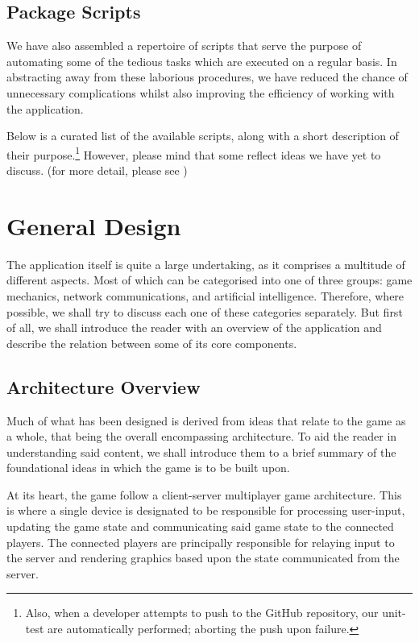 \documentclass{standalone}
\begin{document}
		\subsection{Package Scripts}
			We have also assembled a repertoire of scripts that serve the purpose of automating some of the tedious tasks which are executed on a regular basis. In abstracting away from these laborious procedures, we have reduced the chance of unnecessary complications whilst also improving the efficiency of working with the application.

			Below is a curated list of the available scripts, along with a short description of their purpose.\footnote{Also, when a developer attempts to push to the GitHub repository, our unit-test are automatically performed; aborting the push upon failure.} However, please mind that some reflect ideas we have yet to discuss. (for more detail, please see )
			\begin{formal}
				
			\end{formal}

	\section{General Design}
		The application itself is quite a large undertaking, as it comprises a multitude of different aspects. Most of which can be categorised into one of three groups: game mechanics, network communications, and artificial intelligence. Therefore, where possible, we shall try to discuss each one of these categories separately. But first of all, we shall introduce the reader with an overview of the application and describe the relation between some of its core components.

		\subsection{Architecture Overview} \label{sec:architectureOverview}
			Much of what has been designed is derived from ideas that relate to the game as a whole, that being the overall encompassing architecture. To aid the reader in understanding said content, we shall introduce them to a brief summary of the foundational ideas in which the game is to be built upon.

			At its heart, the game follow a client-server multiplayer game architecture. This is where a single device is designated to be responsible for processing user-input, updating the game state and communicating said game state to the connected players. The connected players are principally responsible for relaying input to the server and rendering graphics based upon the state communicated from the server.
\end{document}
